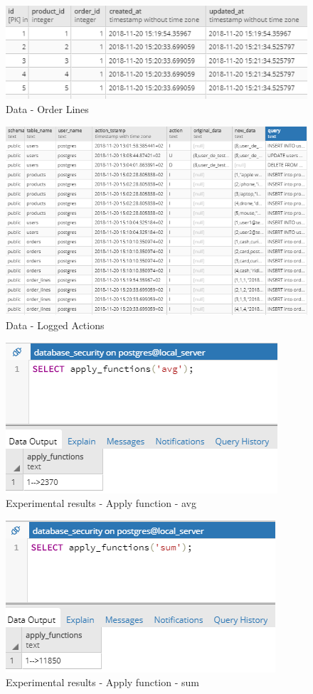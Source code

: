 \documentclass{article}
\begin{document}
\begin{figure}
\centering
\includegraphics[scale=1]{d5}
\caption{Data - Order Lines}
\end{figure}
\begin{figure}
\centering
\includegraphics[scale=0.9]{d6}
\caption{Data - Logged Actions}
\end{figure}
\begin{figure}
\centering
\includegraphics[scale=1]{r1}
\caption{Experimental results - Apply function - avg}
\end{figure}
\begin{figure}
\centering
\includegraphics[scale=1]{r2}
\caption{Experimental results - Apply function - sum}
\end{figure}
\end{document}
